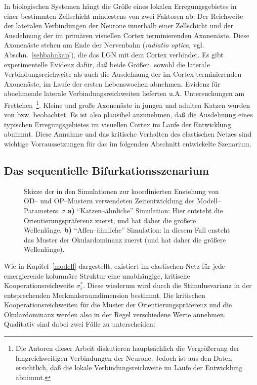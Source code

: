 In biologischen Systemen hängt die Größe eines lokalen Erregungsgebietes
in einer bestimmten Zellschicht mindestens von zwei Faktoren ab: Der
Reichweite der lateralen Verbindungen der Neurone innerhalb einer
Zellschicht und der Ausdehnung der im primären visuellen Cortex
terminierenden Axonenäste. Diese Axonenäste stehen am Ende der
Nervenbahn (\emph{radiatio optica}, vgl. Abschn.~\ref{sehbahnkap}), die das
LGN mit dem Cortex verbindet. Es gibt experimentelle Evidenz dafür, daß
beide Größen, sowohl die laterale Verbindungsreichweite als auch die
Ausdehnung der im Cortex terminierenden Axonenäste, im Laufe der ersten
Lebenswochen abnehmen. Evidenz für abnehmende laterale
Verbindungsreichweiten lieferten u.A. Untersuchungen am Frettchen~\cite{katz:1994}\footnote{Die Autoren dieser Arbeit diskutieren hauptsächlich
die Vergrößerung der langreichweitigen Verbindungen der Neurone. Jedoch
ist aus den Daten ersichtlich, daß die lokale Verbindungsreichweite im
Laufe der Entwicklung abnimmt.}. Kleine und große Axonenäste in jungen und
adulten Katzen wurden von \textcite{ferster:1978}
bzw. \textcite{levay:1979} beobachtet. Es ist also plausibel anzunehmen,
daß die Ausdehnung eines typischen Erregungsgebietes im visuellen Cortex
im Laufe der Entwicklung abnimmt. Diese Annahme und das kritische Verhalten
des elastischen Netzes sind wichtige Vorraussetzungen für das im folgenden
Abschnitt entwickelte Szenarium.

\subsection{Das sequentielle Bifurkationsszenarium}

\begin{figure}[t]
    \centering
    \caption{Skizze der in den Simulationen zur koordinierten Enstehung von
    OD-- und OP--Mustern verwendeten Zeitentwicklung des
    Modell--Parameters~$\sigma$ \textbf{a)} ``Katzen--ähnliche'' Simulation:
    Hier entsteht die Orientierungspräferenz zuerst, und hat daher die
    größere Wellenlänge. \textbf{b)} ``Affen--ähnliche'' Simulation: in
    diesem Fall ensteht das Muster der Okulardominanz zuerst (und hat daher die
    größere Wellenlänge).}
    \label{zeitentwicklung}
\end{figure}

Wie in Kapitel~\ref{modell} dargestellt, existiert im elastischen Netz für
jede emergierende kolumnäre Struktur eine unabhängige, kritische
Kooperationsreichweite $\sigma_i^\ast$. Diese wiederum wird durch die
Stimulusvarianz in der entsprechenden Merkmalsraumdimension bestimmt. Die
kritischen Kooperationsreichweiten für die Muster der
Orientierungspräferenz und die Okulardominanz werden also in der Regel
verschiedene Werte annehmen. Qualitativ sind dabei zwei Fälle zu
unterscheiden:

